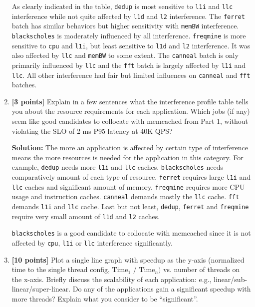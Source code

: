 \documentclass[11pt]{article}
\begin{document}
\begin{enumerate}
    As clearly indicated in the table, \texttt{dedup} is most sensitive to \texttt{l1i} and \texttt{llc} interference while not quite affected by \texttt{l1d} and \texttt{l2} interference. The \texttt{ferret} batch has similar behaviors but higher sensitivity with \texttt{memBW} interference. \texttt{blackscholes} is moderately influenced by all interference. \texttt{freqmine} is more sensitive to \texttt{cpu} and \texttt{l1i}, but least sensitive to \texttt{l1d} and \texttt{l2} interference. It was also affected by \texttt{llc} and \texttt{memBW} to some extent. The \texttt{canneal} batch is only primarily influenced by \texttt{llc} and the \texttt{fft} batch is largely affected by \texttt{l1i} and \texttt{llc}. All other interference had fair but limited influences on \texttt{canneal} and \texttt{fft} batches.
    
    \item \textbf{[3 points]} Explain in a few sentences what the interference profile table tells you about the resource requirements
    for each application. Which jobs (if any) seem like good candidates to collocate with memcached from Part 1, without violating the SLO of
    2 ms P95 latency at 40K QPS? 
    
    \textbf{Solution:} The more an application is affected by certain type of interference means the more resources is needed for the application in this category. For example, \texttt{dedup} needs more \texttt{l1i} and \texttt{llc} caches. \texttt{blackscholes} needs comparatively amount of each type of resource. \texttt{ferret} requires large \texttt{l1i} and \texttt{llc} caches and significant amount of memory. \texttt{freqmine} requires more CPU usage and instruction caches. \texttt{canneal} demands mostly the \texttt{llc} cache. \texttt{fft} demands \texttt{l1i} and \texttt{llc} cache. Last but not least, \texttt{dedup}, \texttt{ferret} and \texttt{freqmine} require very small amount of \texttt{l1d} and \texttt{l2} caches.
    
    \texttt{blackscholes} is a good candidate to collocate with memcached since it is not affected by \texttt{cpu}, \texttt{l1i} or \texttt{llc} interference significantly.
    
    \item \textbf{[10 points]} Plot a single line graph with speedup as the y-axis (normalized time to the single thread config,
    $\textrm{Time}_1$ / $\textrm{Time}_n)$ vs. number of threads on the x-axis. Briefly discuss the scalability of each application: e.g.,
    linear/sub-linear/super-linear. Do any of the applications gain a significant speedup with more threads? Explain what you consider to
    be ``significant''. 
    

\end{enumerate}
\end{document}
